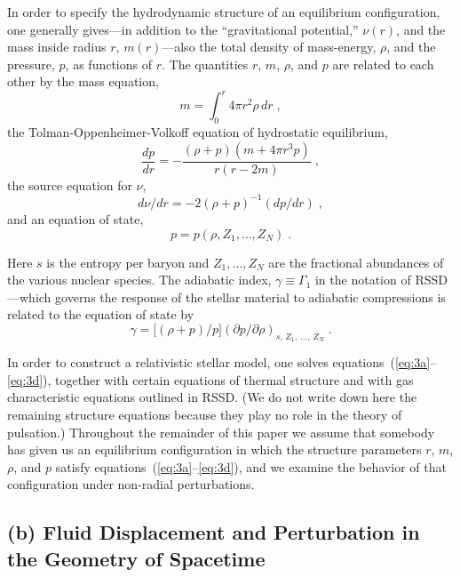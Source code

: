 In order to specify the hydrodynamic structure of an equilibrium configuration, one
generally gives---in addition to the ``gravitational potential,'' $\nu(r)$, and the mass inside
radius $r$, $m(r)$---also the total density of mass-energy, $\rho$, and the pressure, $p$, as functions
of $r$. The quantities $r$, $m$, $\rho$, and $p$ are related to each other by the mass equation,
\begin{equation}
  m = \int_0^r 4\pi r^2 \rho \, dr \;,
\label{eq:3a}
\end{equation}
the Tolman-Oppenheimer-Volkoff equation of hydrostatic equilibrium,
\begin{equation}
  \frac{dp}{dr} = -\frac{(\rho + p)(m + 4\pi r^3 p)}{r(r - 2m)} \;,
\label{eq:3b}
\end{equation}
the source equation for $\nu$,
\begin{equation}
  d\nu/dr = -2(\rho + p)^{-1}(dp/dr) \;,
\label{eq:3c}
\end{equation}
and an equation of state,
\begin{equation}
  p = p(\rho, Z_1, \ldots, Z_N) \;.
\label{eq:3d}
\end{equation}

Here $s$ is the entropy per baryon and $Z_1, \ldots, Z_N$ are the fractional abundances of the
various nuclear species. The adiabatic index, $\gamma \equiv \Gamma_1$ in the notation of RSSD---which
governs the response of the stellar material to adiabatic compressions is related to the
equation of state by
\begin{equation}
  \gamma = \bigl[(\rho + p)/p\bigr](\partial p/\partial \rho)_{s,\, Z_1,\, \ldots,\, Z_N} \;.
\label{eq:4}
\end{equation}

In order to construct a relativistic stellar model, one solves equations~(\ref{eq:3a}--\ref{eq:3d}),
together with certain equations of thermal structure and with gas characteristic equations
outlined in RSSD. (We do not write down here the remaining structure equations because
they play no role in the theory of pulsation.) Throughout the remainder of this
paper we assume that somebody has given us an equilibrium configuration in which
the structure parameters $r$, $m$, $\rho$, and $p$ satisfy equations~(\ref{eq:3a}--\ref{eq:3d}), and we examine the behavior of that configuration under non-radial perturbations.

\subsection*{(b) Fluid Displacement and Perturbation in the Geometry of Spacetime}


